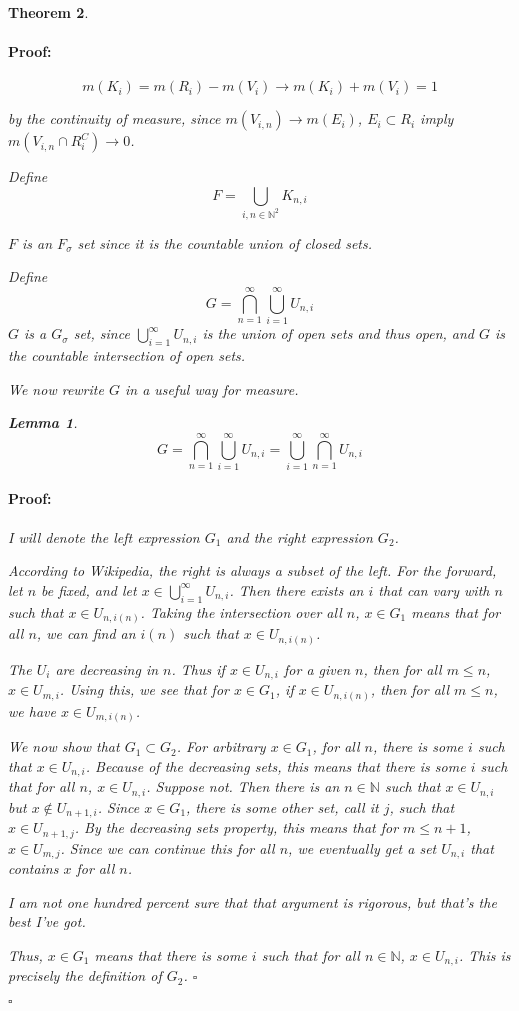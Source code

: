 \documentclass{article}
\newenvironment{proof}{\paragraph{Proof:}}{\hfill$\square$}
\newtheorem{theorem}{Theorem}
\newtheorem{lemma}[theorem]{Lemma}
\newcommand{\N}{\mathbb{N}}
\begin{document}
\begin{theorem}
\begin{proof}
\[
m(K_i) = m(R_i) - m(V_i) \longrightarrow 
m(K_i) + m(V_i) = 1
\]

by the continuity of measure, since $m(V_{i,n}) \rightarrow m(E_i)$, $E_i \subset R_i$ imply $m(V_{i,n} \cap R_i^C) \rightarrow 0$.

Define
\[
F = \bigcup_{i,n \in \N^2} K_{n,i}
\]

$F$ is an $F_\sigma$ set since it is the countable union of closed sets.

Define
\[
G = \bigcap_{n=1}^\infty \bigcup_{i=1}^\infty U_{n,i}
\]
$G$ is a $G_\sigma$ set, since $\bigcup_{i=1}^\infty U_{n,i}$ is the union of open sets and thus open, and $G$ is the countable intersection of open sets.

We now rewrite $G$ in a useful way for measure.

\begin{lemma}
\[
G = \bigcap_{n=1}^\infty \bigcup_{i=1}^\infty U_{n,i} = \bigcup_{i=1}^\infty \bigcap_{n=1}^\infty U_{n,i}
\]
\begin{proof}
I will denote the left expression $G_1$ and the right expression $G_2$.

According to Wikipedia, the right is always a subset of the left. For the forward, let $n$ be fixed, and let $x \in \bigcup_{i=1}^\infty U_{n,i}$. Then there exists an $i$ that can vary with $n$ such that $x \in U_{n, i(n)}$. 
Taking the intersection over all $n$, $x \in G_1$ means that for all $n$, we can find an $i(n)$ such that $x \in U_{n, i(n)}$.

The $U_i$ are decreasing in $n$. Thus if $x \in U_{n, i}$ for a given $n$, then for all $m \leq n$, $x \in U_{m, i}$. Using this, we see that for $x \in G_1$, if $x \in U_{n, i(n)}$, then for all $m \leq n$, we have $x \in U_{m, i(n)}$.

We now show that $G_1 \subset G_2$. For arbitrary $x \in G_1$, for all $n$, there is some $i$ such that $x \in U_{n, i}$. Because of the decreasing sets, this means that there is some $i$ such that for all $n$, $x \in U_{n,i}$. Suppose not. Then there is an $n \in \N$ such that $x \in U_{n, i}$ but $x \notin U_{n+1, i}$. Since $x \in G_1$, there is some other set, call it $j$, such that $x \in U_{n+1, j}$. By the decreasing sets property, this means that for $m \leq n+1$, $x \in U_{m, j}$. Since we can continue this for all $n$, we eventually get a set $U_{n, i}$ that contains $x$ for all $n$.

I am not one hundred percent sure that that argument is rigorous, but that's the best I've got.

Thus, $x \in G_1$ means that there is some $i$ such that for all $n \in \N$, $x \in U_{n, i}$. This is precisely the definition of $G_2$.
\end{proof}
\end{lemma}


\end{proof}
\end{theorem}
\end{document}
